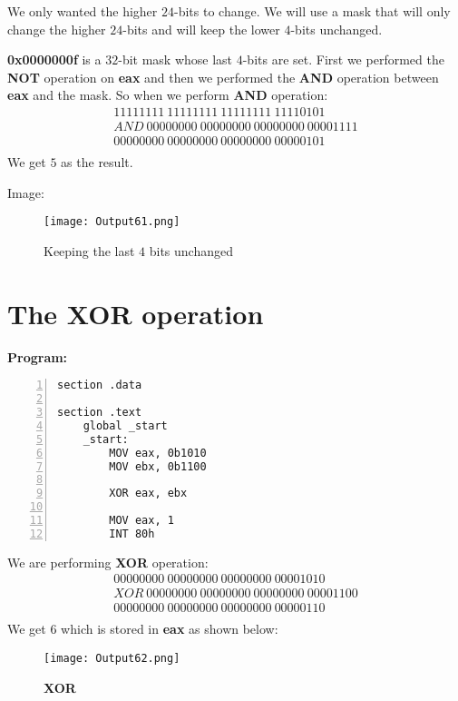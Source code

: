 \documentclass{article}
\makeatletter
\renewcommand\paragraph{\@startsection{paragraph}{4}{\z@}{-3.25ex \@plus -1ex \@minus -.2ex}{1.5ex \@plus .2ex}{\normalfont\normalsize\bfseries}}
\makeatother
\begin{document}
We only wanted the higher $24$-bits to change. We will use a mask that will only change the higher $24$-bits and will keep the lower $4$-bits unchanged.

\textbf{0x0000000f} is a $32$-bit mask whose last $4$-bits are set. First we performed the \textbf{NOT} operation on \textbf{eax} and then we performed the \textbf{AND} operation between \textbf{eax} and the mask.
\newpage
So when we perform \textbf{AND} operation:
\begin{align*}
11111111\ 11111111\ 11111111\ 11110101 \\
AND\ 00000000\ 00000000\ 00000000\ 00001111 \\
\hline
00000000\ 00000000\ 00000000\ 00000101 \\
\end{align*}
We get $5$ as the result.

Image:
\begin{figure}[h]
\centering
\texttt{[image: Output61.png]}
\caption{Keeping the last $4$ bits unchanged}
\label{fig:fig5}
\end{figure}
\newpage
\section{The XOR operation}\label{sec:sec3}
\paragraph{}
\textbf{Program:}
\begin{Verbatim}[numbers=left, frame=single]
section .data

section .text
	global _start
	_start:
		MOV eax, 0b1010
		MOV ebx, 0b1100
		
		XOR eax, ebx
		
		MOV eax, 1
		INT 80h
\end{Verbatim}
We are performing \textbf{XOR} operation:
\begin{align*}
00000000\ 00000000\ 00000000\ 00001010 \\
XOR\ 00000000\ 00000000\ 00000000\ 00001100 \\
\hline
00000000\ 00000000\ 00000000\ 00000110 \\
\end{align*}
We get $6$ which is stored in \textbf{eax} as shown below:
\begin{figure}[h]
\centering
\texttt{[image: Output62.png]}
\caption{\textbf{XOR}}
\label{fig:fig6}
\end{figure}
\end{document}
